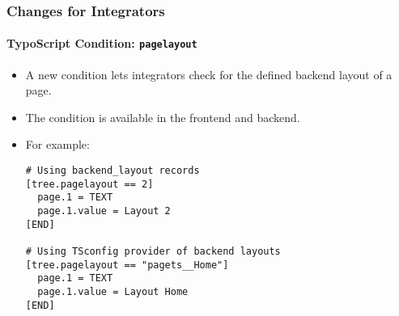 %

\begin{frame}[fragile]
	\frametitle{Changes for Integrators}
	\framesubtitle{TypoScript Condition: \texttt{pagelayout}}


	\begin{itemize}
		\item A new condition lets integrators check for the defined backend
			layout of a page.
		\item The condition is available in the frontend and backend.
		\item For example:\newline
\begin{lstlisting}
# Using backend_layout records
[tree.pagelayout == 2]
  page.1 = TEXT
  page.1.value = Layout 2
[END]

# Using TSconfig provider of backend layouts
[tree.pagelayout == "pagets__Home"]
  page.1 = TEXT
  page.1.value = Layout Home
[END]
\end{lstlisting}

	\end{itemize}
\end{frame}

